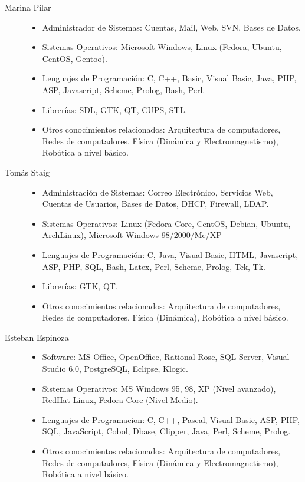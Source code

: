 \documentclass[letterpaper,spanish,10pt]{article}
\begin{document}
\begin{itemize}
		\begin{description}

		\item[Marina Pilar]
			\begin{itemize}
                        \item{Administrador de Sistemas:} Cuentas, Mail, Web, SVN, Bases de Datos.
                        \item{Sistemas Operativos:} Microsoft Windows, Linux (Fedora, Ubuntu, CentOS, Gentoo).
                        \item{Lenguajes de Programaci\'on:} C, C++, Basic, Visual Basic, Java, PHP, ASP, Javascript, Scheme, Prolog, Bash, Perl.
                        \item{Librer\'ias:} SDL, GTK, QT, CUPS, STL.
			\item{Otros conocimientos relacionados:} Arquitectura de computadores, Redes de computadores, F\'isica (Din\'amica y Electromagnetismo), Rob\'otica a nivel b\'asico.
                        \end{itemize}
		
		\item[Tom\'as Staig]
						
			\begin{itemize}
                        \item{Administraci\'on de Sistemas:} Correo Electr\'onico, Servicios Web, Cuentas de Usuarios, Bases de Datos, DHCP, Firewall, LDAP.
                        \item{Sistemas Operativos:} Linux (Fedora Core, CentOS, Debian, Ubuntu, ArchLinux), Microsoft Windows 98/2000/Me/XP
                        \item{Lenguajes de Programaci\'on:} C, Java, Visual Basic, HTML, Javascript, ASP, PHP, SQL, Bash, Latex, Perl, Scheme, Prolog, Tck, Tk.
                        \item{Librer\'ias:} GTK, QT.
			\item{Otros conocimientos relacionados:} Arquitectura de computadores, Redes de computadores, F\'isica (Din\'amica), Rob\'otica a nivel b\'asico.
                        \end{itemize}


		\item[Esteban Espinoza]

			\begin{itemize}
                        \item{Software:} MS Office, OpenOffice, Rational Rose, SQL Server, Visual Studio 6.0, PostgreSQL, Eclipse, Klogic.
                        \item{Sistemas Operativos:} MS Windows 95, 98, XP (Nivel avanzado), RedHat Linux, Fedora Core (Nivel Medio). 
                        \item{Lenguajes de Programacion:} C, C++, Pascal, Visual Basic, ASP, PHP, SQL, JavaScript, Cobol, Dbase, Clipper, Java, Perl, Scheme, Prolog.
			\item{Otros conocimientos relacionados:} Arquitectura de computadores, Redes de computadores, F\'isica (Din\'amica y Electromagnetismo), Rob\'otica a nivel b\'asico.
                        \end{itemize}



\end{description}
\end{itemize}
\end{document}
